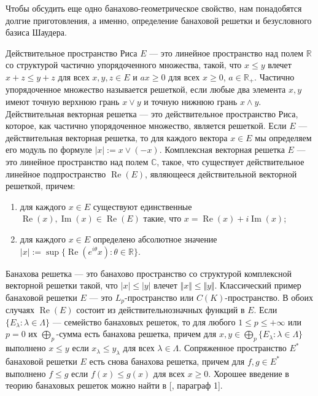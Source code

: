 Чтобы обсудить еще одно банахово-геометрическое свойство, нам понадобятся долгие
приготовления, а именно, определение банаховой решетки и безусловного базиса
Шаудера. 

Действительное пространство Риса $E$ --- это линейное пространство над полем
$\mathbb{R}$ со структурой частично упорядоченного множества, такой, что  $x\leq
y$ влечет $x+z\leq y+z$ для всех $x,y,z\in E$ и $ax\geq 0$ для всех $x\geq 0$,
$a\in\mathbb{R}_+$. Частично упорядоченное множество называется решеткой, если
любые два элемента ${x,y}$ имеют точную верхнюю грань $x\vee y$ и точную нижнюю
грань $x\wedge y$. Действительная векторная решетка --- это действительное
пространство Риса, которое, как частично упорядоченное множество, является
решеткой. Если $E$ --- действительная векторная решетка, то для каждого вектора
$x\in E$ мы определяем его модуль по формуле $|x|:=x\vee(-x)$. Комплексная
векторная решетка $E$ --- это линейное пространство над полем $\mathbb{C}$,
такое, что существует действительное линейное подпространство
$\operatorname{Re}(E)$, являющееся действительной векторной решеткой, причем:
\begin{enumerate}[label = (\roman*)]
    \item для каждого $x\in E$ существуют единственные
    $\operatorname{Re}(x),\operatorname{Im}(x)\in \operatorname{Re}(E)$ такие,
    что $x=\operatorname{Re}(x)+i\operatorname{Im}(x)$;

    \item для каждого $x\in E$ определено абсолютное значение $|x|:=\sup
    \{\operatorname{Re}(e^{i\theta}x):\theta\in\mathbb{R} \}$.
\end{enumerate}

Банахова решетка --- это банахово пространство со структурой комплексной
векторной решетки такой, что $|x|\leq |y|$ влечет $\Vert x\Vert\leq \Vert
y\Vert$. Классический пример банаховой решетки $E$ --- это $L_p$-пространство
или $C(K)$-пространство. В обоих случаях $\operatorname{Re}(E)$ состоит из
действительнозначных функций в $E$. Если $ \{E_\lambda:\lambda\in\Lambda \}$ ---
семейство банаховых решеток, то для любого $1\leq p\leq +\infty$ или $p=0$ их
$\bigoplus_p$-сумма есть банахова решетка, причем для $x,y\in\bigoplus_p \{
E_\lambda:\lambda\in\Lambda \}$ выполнено $x\leq y$ если $x_\lambda\leq
y_\lambda$ для всех $\lambda\in\Lambda$. Сопряженное пространство $E^*$
банаховой решетки $E$ есть снова банахова решетка, причем для $f,g\in  E^*$
выполнено $f\leq g$ если $f(x)\leq g(x)$ для всех $x\geq 0$. Хорошее введение в
теорию банаховых решеток можно найти в [\cite{LaceyIsomThOfClassicBanSp},
параграф 1].

